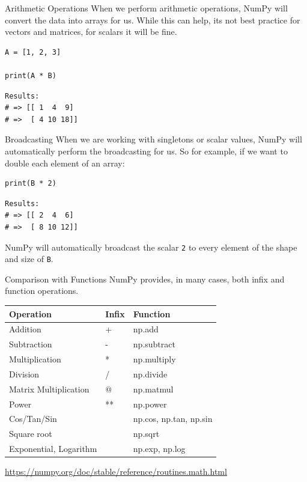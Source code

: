 \documentclass[10pt]{beamer}
\begin{document}
\begin{frame}[label={sec:org18e098d},fragile]{Arithmetic Operations}
 When we perform arithmetic operations, NumPy will convert the data into arrays for
us. While this can help, its not best practice for vectors and matrices, for scalars
it will be fine.

\begin{verbatim}
A = [1, 2, 3]

print(A * B)
\end{verbatim}

\begin{verbatim}
Results: 
# => [[ 1  4  9]
# =>  [ 4 10 18]]
\end{verbatim}
\end{frame}

\begin{frame}[label={sec:org3e69306},fragile]{Broadcasting}
 When we are working with singletons or scalar values, NumPy will automatically
perform the broadcasting for us. So for example, if we want to double each element of
an array:

\begin{verbatim}
print(B * 2)
\end{verbatim}

\begin{verbatim}
Results: 
# => [[ 2  4  6]
# =>  [ 8 10 12]]
\end{verbatim}


NumPy will automatically broadcast the scalar \texttt{2} to every element of the shape and
size of \texttt{B}.
\end{frame}

\begin{frame}[label={sec:orgddd536d}]{Comparison with Functions}
NumPy provides, in many cases, both infix and function operations.

\begin{center}
\begin{tabular}{lll}
Operation & Infix & Function\\
\hline
Addition & + & np.add\\
Subtraction & - & np.subtract\\
Multiplication & * & np.multiply\\
Division & / & np.divide\\
Matrix Multiplication & @ & np.matmul\\
Power & ** & np.power\\
Cos/Tan/Sin &  & np.cos, np.tan, np.sin\\
Square root &  & np.sqrt\\
Exponential, Logarithm &  & np.exp, np.log\\
\end{tabular}
\end{center}

\url{https://numpy.org/doc/stable/reference/routines.math.html}
\end{frame}
\end{document}
